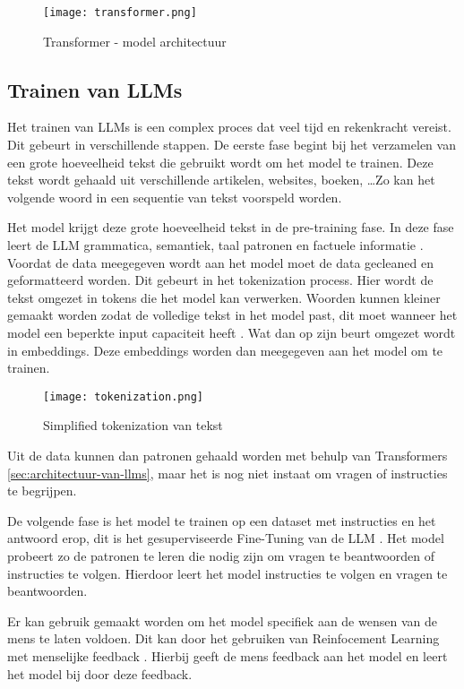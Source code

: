 \begin{figure}[h]
  \centering
  \texttt{[image: transformer.png]}
  \caption{Transformer - model architectuur \autocite{VaswaniEtAl2017}}
  \label{fig:transformer-model}
\end{figure}

\subsection{Trainen van LLMs}
\label{sec:trainen-van-llms}
Het trainen van LLMs is een complex proces dat veel tijd en rekenkracht vereist. Dit gebeurt in verschillende stappen.
De eerste fase begint bij het verzamelen van een grote hoeveelheid tekst die gebruikt wordt om het model te trainen.
Deze tekst wordt gehaald uit verschillende artikelen, websites, boeken, \dots Zo kan het volgende woord in een sequentie van tekst voorspeld worden.

Het model krijgt deze grote hoeveelheid tekst in de pre-training fase.
In deze fase leert de LLM grammatica, semantiek, taal patronen en factuele informatie \autocite{Cacic2023}.
Voordat de data meegegeven wordt aan het model moet de data gecleaned en geformatteerd worden.
Dit gebeurt in het tokenization process. Hier wordt de tekst omgezet in tokens die het model kan verwerken.
Woorden kunnen kleiner gemaakt worden zodat de volledige tekst in het model past, dit moet wanneer het model een beperkte input capaciteit heeft \autocite{ElHousieny2023}.
Wat dan op zijn beurt omgezet wordt in embeddings. Deze embeddings worden dan meegegeven aan het model om te trainen.
\begin{figure}[h]
  \centering
  \texttt{[image: tokenization.png]}
  \caption{Simplified tokenization van tekst \autocite{TeeTracker2023}}
  \label{fig:tokenization}
\end{figure}
Uit de data kunnen dan patronen gehaald worden met behulp van Transformers \ref{sec:architectuur-van-llms}, maar het is nog niet instaat om vragen of instructies te begrijpen.

De volgende fase is het model te trainen op een dataset met instructies en het antwoord erop, dit is het gesuperviseerde Fine-Tuning van de LLM \autocite{Das2024}. 
Het model probeert zo de patronen te leren die nodig zijn om vragen te beantwoorden of instructies te volgen.
Hierdoor leert het model instructies te volgen en vragen te beantwoorden.

Er kan gebruik gemaakt worden om het model specifiek aan de wensen van de mens te laten voldoen. Dit kan door het gebruiken van Reinfocement Learning met menselijke feedback \autocite{LambertEtAL2022}. 
Hierbij geeft de mens feedback aan het model en leert het model bij door deze feedback.

